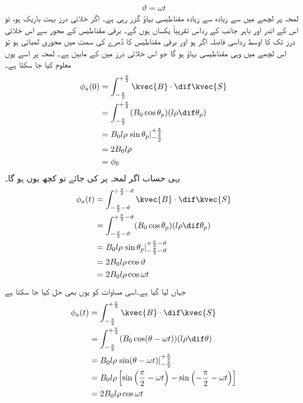 \begin{align}
\vartheta=\omega t
\end{align}
لمحہ  پر لچھے میں سے زیادہ سے زیادہ مقناطیسی بہاؤ گزر رہی ہے۔ اگر خلائی درز بہت باریک ہو، تو اس کے اندر اور باہر جانب کے رداس تقریباً یکساں ہوں گے۔ برقی مقناطیس کے محور سے اس خلائی درز تک کا اوسط رداسی فاصلہ اگر  ہو اور برقی مقناطیس کا دُھرے کی سمت میں محوری لمبائی  ہو تو اس لچھے میں وہی مقناطیسی بہاؤ ہو گا جو اس خلائی درز میں    کے مابین ہے۔ لمحہ  پر اسے یوں معلوم کیا جا سکتا ہے۔
\begin{gather}
\begin{aligned}
\phi_a(0)&=\int_{-\frac{\pi}{2}}^{+\frac{\pi}{2}} \kvec{B} \cdot \dif \kvec{S}\\
&=\int_{-\frac{\pi}{2}}^{+\frac{\pi}{2}} (B_0 \cos \theta_p)(l \rho \dif \theta_p)\\
&=B_0 l \rho \left. \sin \theta_p \right|_{-\frac{\pi}{2}}^{+\frac{\pi}{2}}\\
&=2 B_0 l \rho\\
&=\phi_0
\end{aligned}
\end{gather}
 یہی حساب اگر لمحہ  پر کی جائے تو کچھ یوں ہو گا۔
\begin{gather}
\begin{aligned}
\phi_a(t)&=\int_{-\frac{\pi}{2}-\vartheta}^{+\frac{\pi}{2}-\vartheta} \kvec{B} \cdot \dif \kvec{S}\\
&=\int_{-\frac{\pi}{2}-\vartheta}^{+\frac{\pi}{2}-\vartheta} (B_0 \cos \theta_p)(l \rho \dif \theta_p)\\
&=B_0 l \rho \left. \sin \theta_p \right|_{-\frac{\pi}{2}-\vartheta}^{+\frac{\pi}{2}-\vartheta}\\
&=2 B_0 l \rho \cos \vartheta\\
&=2 B_0 l \rho \cos \omega t
\end{aligned}
\end{gather}
جہاں  لیا گیا ہے۔اسی مساوات کو یوں بھی حل کیا جا سکتا ہے
\begin{gather}
\begin{aligned}
\phi_a(t)&=\int_{-\frac{\pi}{2}}^{+\frac{\pi}{2}} \kvec{B} \cdot \dif \kvec{S}\\
&=\int_{-\frac{\pi}{2}}^{+\frac{\pi}{2}} (B_0 \cos (\theta-\omega t))(l \rho \dif \theta)\\
&=B_0 l \rho \left. \sin (\theta-\omega t) \right|_{-\frac{\pi}{2}}^{+\frac{\pi}{2}}\\
&=B_0 l \rho \left[\sin \left(\frac{\pi}{2}-\omega t \right )-\sin \left (-\frac{\pi}{2}-\omega t \right) \right]\\
&=2 B_0 l \rho \cos \omega t
\end{aligned}
\end{gather}
